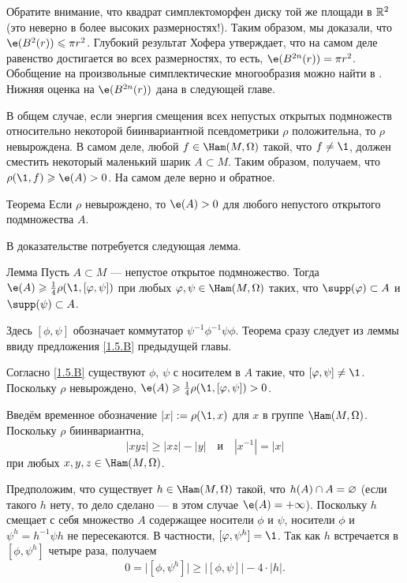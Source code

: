 Обратите внимание, что квадрат симплектоморфен диску той же площади в $\mathbb{R}^2$ (это неверно в более высоких размерностях!).
Таким образом, мы доказали, что $\e (B^2 (r)) \le \pi r^2$.
Глубокий результат Хофера \cite{H1} утверждает, что на самом деле равенство
достигается во всех размерностях, то есть, $\e (B^{2n} (r)) = \pi r^2$.
Обобщение на произвольные симплектические многообразия можно найти в \cite{LM1}.
Нижняя оценка на $\e(B^{2n} (r))$ дана в следующей главе.

В общем случае, если энергия смещения всех непустых открытых подмножеств относительно некоторой биинвариантной псевдометрики $\rho$ положительна, то $\rho$ невырождена.
В самом деле, любой $f \in \Ham (M, \Omega)$ такой, что $f \ne \1$,
должен сместить некоторый маленький шарик $A \subset M$.
Таким образом, получаем, что $\rho (\1, f) \ge \e (A)> 0$.
На самом деле верно и обратное.

\begin{thm}[(\cite{EP})]{Теорема}\label{2.4.A}
Если $\rho$ невырождено, то $\e (A)> 0$ для любого непустого открытого подмножества $A$.
\end{thm}

В доказательстве потребуется следующая лемма.

\begin{thm}{Лемма}\label{2.4.B}
Пусть $A \subset M$ — непустое открытое подмножество.
Тогда $\e (A) \ge \tfrac14 \rho (\1, [\phi, \psi])$ при любых $\phi, \psi \in \Ham (M, \Omega)$ таких, что $\supp (\phi) \subset A$ и $\supp (\psi) \subset A$.
\end{thm}

Здесь $[\phi, \psi]$ обозначает коммутатор $\psi^{-1} \phi^{-1} \psi\phi$.
Теорема сразу следует из леммы ввиду предложения \ref{1.5.B} предыдущей главы.

Согласно \ref{1.5.B} существуют $\phi$, $\psi$ с носителем в $A$ такие, что $[\phi, \psi] \ne \1$.
Поскольку $\rho$ невырождено, $\e (A) \z\ge \tfrac14 \rho (\1, [\phi, \psi])> 0$.
\qeds


Введём временное обозначение $|x|\z\df\rho(\1,x)$
для $x$ в группе $\Ham (M, \Omega)$.
Поскольку $\rho$ биинвариантна,
\[
|xyz|
\ge
|xz|-|y|
\quad\text{и}\quad
|x^{-1}|=|x|
\]
при любых $x,y,z\in \Ham (M, \Omega)$.

Предположим, что существует $h \in \Ham (M, \Omega)$ такой, что $h (A) \z\cap A \z= \emptyset$ (если такого $h$ нету, то дело сделано — в этом случае $\e (A) \z= + \infty$).
Поскольку $h$ смещает с себя множество $A$ содержащее носители $\phi$ и $\psi$,
носители $\phi$ и $\psi^{h}=h^{-1} \psi h$ не пересекаются.
В частности, $[\phi,\psi^{h}]=\1$.
Так как $h$ встречается в $[\phi,\psi^{h}]$ четыре раза, получаем
\[
0=\big|[\phi,\psi^{h}]\big|
\ge
\big|[\phi,\psi]\big| - 4\cdot|h|.
\]
\qedsf

